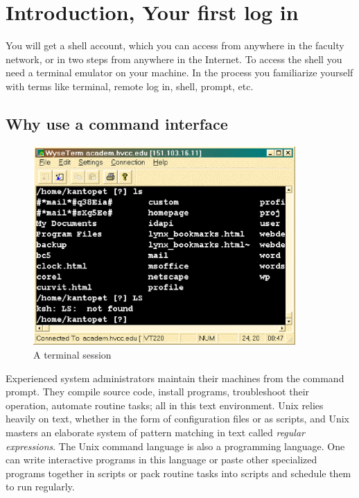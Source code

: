 \documentclass[11pt,a4paper,twoside]{article}
\begin{document}
\newpage

\section{Introduction, Your first log in}
\setcounter{page}{1}

You will get a shell account, which you can access from anywhere in the
faculty network, or in two steps from anywhere in the Internet. To access
the shell you need a terminal emulator on your machine. In the process you 
familiarize yourself with terms like terminal, remote log in, shell, 
prompt, etc.

\subsection{Why use a command interface}

\begin{figure}[htb]
  \begin{center}
    \includegraphics[width=10cm]{images/scr_casesense}
    \caption{A terminal session}
  \end{center}
\end{figure}

Experienced system administrators maintain their machines from the command 
prompt. They compile source code, install programs, troubleshoot their 
operation, automate routine tasks; all in this text environment. Unix relies 
heavily on text, whether in the form of configuration files or as scripts, 
and Unix masters an elaborate system of pattern matching in text called 
\emph{regular expressions}. The Unix command language is also a programming 
language. One can write interactive programs in this language or paste other
specialized programs together in scripts or pack routine tasks into scripts 
and schedule them to run regularly.
\end{document}
